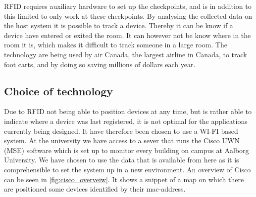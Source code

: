 RFID requires auxiliary hardware to set up the checkpoints, and is in addition to this limited to only work at these checkpoints. By analysing the collected data on the host system it is possible to track a device. Thereby it can be know if a device have entered or exited the room. It can however not be know where in the room it is, which makes it difficult to track someone in a large room.
The technology are being used by air Canada, the largest airline in Canada, to track foot carts, and by doing so saving millions of dollars each year\cite{RFIDjournal}.




\subsection{Choice of technology}\label{subsec:cisco}
Due to RFID not being able to position devices at any time, but is rather able to indicate where a device was last registered, it is not optimal for the applications currently being designed. It have therefore been chosen to use a WI-FI based system.
At the university we have access to a sever that runs the Cisco UWN (MSE) software which is set up to monitor every building on campus at Aalborg University. We have chosen to use the data that is available from here as it is comprehensible to set the system up in a new environment. An overview of Cisco can be seen in \cref{fig:cisco_overveiw}. It shows a snippet of a map on which there are positioned some devices identified by their mac-address.

